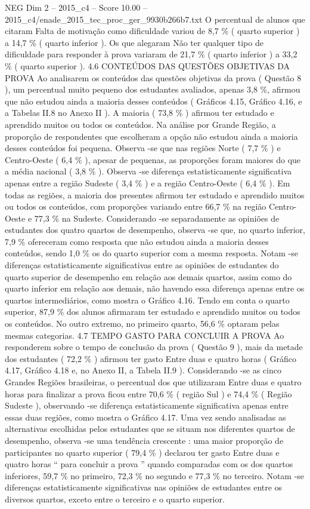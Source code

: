 \begin{textsample}{NEG Dim 2 – 2015\_c4 – Score 10.00 – 2015\_c4/enade\_2015\_tec\_proc\_ger\_9930b266b7.txt}
O percentual de alunos que citaram Falta de motivação como dificuldade variou de 8,7 \% ( quarto superior ) a 14,7 \% ( quarto inferior ).
Os que alegaram Não ter qualquer tipo de dificuldade para responder à prova variaram de 21,7 \% ( quarto inferior ) a 33,2 \% ( quarto superior ). 4.6 CONTEÚDOS DAS QUESTÕES OBJETIVAS DA PROVA Ao analisarem os conteúdos das questões objetivas da prova ( Questão 8 ), um percentual muito pequeno dos estudantes avaliados, apenas 3,8 \%, afirmou que não estudou ainda a maioria desses conteúdos ( Gráficos 4.15, Gráfico 4.16, e a Tabelas II.8 no Anexo II ).
A maioria ( 73,8 \% ) afirmou ter estudado e aprendido muitos ou todos os conteúdos.
Na análise por Grande Região, a proporção de respondentes que escolheram a opção não estudou ainda a maioria desses conteúdos foi pequena.
Observa -se que nas regiões Norte ( 7,7 \% ) e Centro-Oeste ( 6,4 \% ), apesar de pequenas, as proporções foram maiores do que a média nacional ( 3,8 \% ).
Observa -se diferença estatisticamente significativa apenas entre a região Sudeste ( 3,4 \% ) e a região Centro-Oeste ( 6,4 \% ).
Em todas as regiões, a maioria dos presentes afirmou ter estudado e aprendido muitos ou todos os conteúdos, com proporções variando entre 66,7 \% na região Centro-Oeste e 77,3 \% na Sudeste.
Considerando -se separadamente as opiniões de estudantes dos quatro quartos de desempenho, observa -se que, no quarto inferior, 7,9 \% ofereceram como resposta que não estudou ainda a maioria desses conteúdos, sendo 1,0 \% os do quarto superior com a mesma resposta.
Notam -se diferenças estatisticamente significativas entre as opiniões de estudantes do quarto superior de desempenho em relação aos demais quartos, assim como do quarto inferior em relação aos demais, não havendo essa diferença apenas entre os quartos intermediários, como mostra o Gráfico 4.16.
Tendo em conta o quarto superior, 87,9 \% dos alunos afirmaram ter estudado e aprendido muitos ou todos os conteúdos.
No outro extremo, no primeiro quarto, 56,6 \% optaram pelas mesmas categorias. 4.7 TEMPO GASTO PARA CONCLUIR A PROVA Ao responderem sobre o tempo de conclusão da prova ( Questão 9 ), mais da metade dos estudantes ( 72,2 \% ) afirmou ter gasto Entre duas e quatro horas ( Gráfico 4.17, Gráfico 4.18 e, no Anexo II, a Tabela II.9 ).
Considerando -se as cinco Grandes Regiões brasileiras, o percentual dos que utilizaram Entre duas e quatro horas para finalizar a prova ficou entre 70,6 \% ( região Sul ) e 74,4 \% ( Região Sudeste ), observando -se diferença estatisticamente significativa apenas entre essas duas regiões, como mostra o Gráfico 4.17.
Uma vez sendo analisadas as alternativas escolhidas pelos estudantes que se situam nos diferentes quartos de desempenho, observa -se uma tendência crescente : uma maior proporção de participantes no quarto superior ( 79,4 \% ) declarou ter gasto Entre duas e quatro horas “ para concluir a prova ” quando comparadas com os dos quartos inferiores, 59,7 \% no primeiro, 72,3 \% no segundo e 77,3 \% no terceiro.
Notam -se diferenças estatisticamente significativas nas opiniões de estudantes entre os diversos quartos, exceto entre o terceiro e o quarto superior.

\end{textsample}
